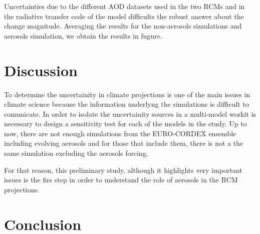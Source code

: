 Uncertainties due to the different AOD datasets used in the two RCMs and in the radiative transfer code of the model difficults the robust answer about the change magnitude. Averaging the results for the non-aerosols simulations and aerosols simulation, we obtain the results in fugure.

\section{Discussion}

To determine the uncertainity in climate projections is one of the main issues in climate science because the information underlyng the simulations is difficult to comunicate. In order to isolate the uncertainity sources in a multi-model workit is necessary to design a sensitivity test for each of the models in the study. Up to now, there are not enough simulations from the EURO-CORDEX ensemble including evolving aerosols and for those that include them, there is not a the same simulation excluding the aerosols forcing.

For that reason, this preliminary study, although it highlights very important issues is the firs step in order to understand the role of aerosols in the RCM projections.

\section{Conclusion}

% 